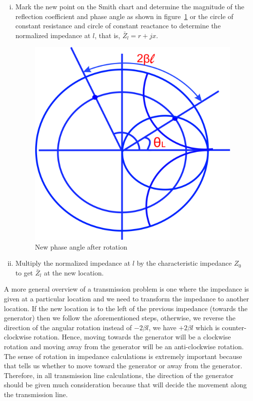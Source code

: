 \begin{enumerate}[(i)]
\item Mark the new point on the Smith chart and determine the magnitude of the reflection coefficient and phase angle as shown in figure~\ref{fig:uyhbgjvkclxse} or the circle of constant resistance and circle of constant reactance to determine the normalized impedance at $l$, that is, $\bar{Z}_{l} = r + jx$.
\begin{figure}[h]
\centering
\includegraphics[width=0.7\linewidth]{./graphics/uyhbgjvkclxse}
\caption{New phase angle after rotation}
\label{fig:uyhbgjvkclxse}
\end{figure}

\item Multiply the normalized impedance at $l$ by the characteristic impedance $Z_0$ to get $\bar{Z}_{l}$ at the new location.
\end{enumerate}

A more general overview of a transmission problem is one where the impedance is given at a particular location and we need to transform the impedance to another location. If the new location is to the left of the previous impedance (towards the generator) then we follow the aforementioned steps, otherwise, we reverse the direction of the angular rotation instead of $-2\beta{l}$, we have $+2\beta{l}$ which is counter-clockwise rotation. Hence, moving towards the generator will be a clockwise rotation and moving away from the generator will be an anti-clockwise rotation. The sense of rotation in impedance calculations is extremely important because that tells us whether to move toward the generator or away from the generator. Therefore, in all transmission line calculations, the direction of the generator should be given much consideration because that will decide the movement along the transmission line.

